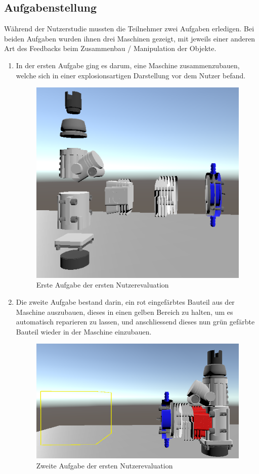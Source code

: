 \subsection{Aufgabenstellung}
Während der Nutzerstudie mussten die Teilnehmer zwei Aufgaben erledigen. Bei beiden Aufgaben wurden ihnen drei Maschinen gezeigt, mit jeweils einer anderen Art des Feedbacks beim Zusammenbau / Manipulation der Objekte.
\begin{enumerate}
	\item In der ersten Aufgabe ging es darum, eine Maschine zusammenzubauen, welche sich in einer explosionsartigen Darstellung vor dem Nutzer befand. 
	
	\begin{figure}[h!]
		\centering
		\includegraphics[keepaspectratio,width=0.35\linewidth]{img/Evaluation_Task1.PNG}
		\caption{Erste Aufgabe der ersten Nutzerevaluation}
		\label{fig:evaluation1_task1}
	\end{figure}
	
	\item Die zweite Aufgabe bestand darin, ein rot eingefärbtes Bauteil aus der Maschine auszubauen, dieses in einen gelben Bereich zu halten, um es automatisch reparieren zu lassen, und anschliessend dieses nun grün gefärbte Bauteil wieder in der Maschine einzubauen.
	
	\begin{figure}[h!]
		\centering
		\includegraphics[keepaspectratio,width=0.45\linewidth]{img/Evaluation_Task2.PNG}
		\caption{Zweite Aufgabe der ersten Nutzerevaluation}
		\label{fig:evaluation1_task2}
	\end{figure}
	
\end{enumerate}

